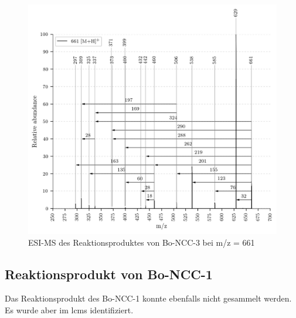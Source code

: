 \begin{figure}[!htbp]
  \centering
  \includegraphics[width=\textwidth, height=0.7\textwidth]{figures/Kapitel7/Kataboliten/VWA_MS_661.png}
  \caption[ESI-MS des Reaktionsproduktes von Bo-NCC-3, Quelle: Author]{ESI-MS des Reaktionsproduktes von Bo-NCC-3 bei m/z = 661}
  \label{fig:661MH}
\end{figure}

\subsection{Reaktionsprodukt von Bo-NCC-1}

Das Reaktionsprodukt des Bo-NCC-1 konnte ebenfalls nicht gesammelt werden. Es wurde aber im \gls{lcms} identifiziert.

